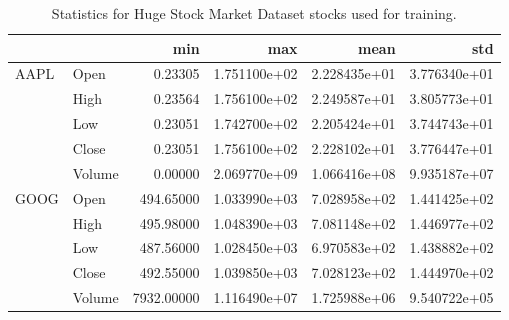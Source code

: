 \begin{table}
\centering
\caption{Statistics for Huge Stock Market Dataset stocks used for training.}
\label{table:dataset_metrics}
\begin{tabular}{llrrrr}
\toprule
     &        &         min &           max &          mean &           std \\
\midrule
\multirow{5}{*}{AAPL} & Open &     0.23305 &  1.751100e+02 &  2.228435e+01 &  3.776340e+01 \\
     & High &     0.23564 &  1.756100e+02 &  2.249587e+01 &  3.805773e+01 \\
     & Low &     0.23051 &  1.742700e+02 &  2.205424e+01 &  3.744743e+01 \\
     & Close &     0.23051 &  1.756100e+02 &  2.228102e+01 &  3.776447e+01 \\
     & Volume &     0.00000 &  2.069770e+09 &  1.066416e+08 &  9.935187e+07 \\
\cline{1-6}
\multirow{5}{*}{GOOG} & Open &   494.65000 &  1.033990e+03 &  7.028958e+02 &  1.441425e+02 \\
     & High &   495.98000 &  1.048390e+03 &  7.081148e+02 &  1.446977e+02 \\
     & Low &   487.56000 &  1.028450e+03 &  6.970583e+02 &  1.438882e+02 \\
     & Close &   492.55000 &  1.039850e+03 &  7.028123e+02 &  1.444970e+02 \\
     & Volume &  7932.00000 &  1.116490e+07 &  1.725988e+06 &  9.540722e+05 \\
\bottomrule
\end{tabular}
\end{table}
